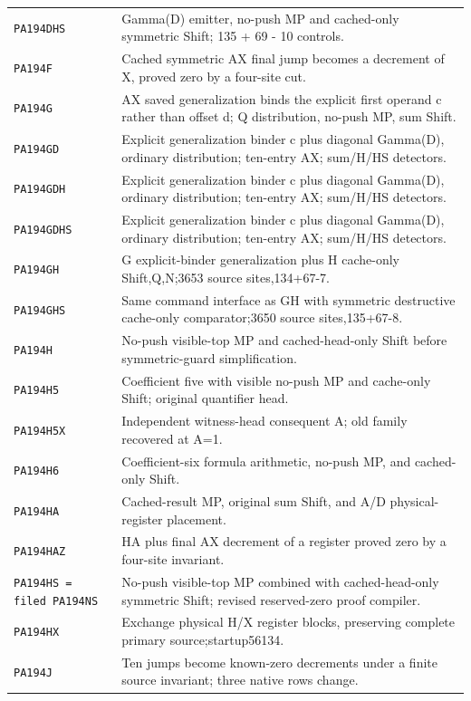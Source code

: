 \begin{longtable}{@{}p{.29\linewidth}p{.65\linewidth}@{}}
\texttt{PA194DHS} & Gamma(D) emitter, no-push MP and cached-only symmetric Shift; 135 + 69 - 10 controls.\\[3pt]
\texttt{PA194F} & Cached symmetric AX final jump becomes a decrement of X, proved zero by a four-site cut.\\[3pt]
\texttt{PA194G} & AX saved generalization binds the explicit first operand c rather than offset d; Q distribution, no-push MP, sum Shift.\\[3pt]
\texttt{PA194GD} & Explicit generalization binder c plus diagonal Gamma(D), ordinary distribution; ten-entry AX; sum/H/HS detectors.\\[3pt]
\texttt{PA194GDH} & Explicit generalization binder c plus diagonal Gamma(D), ordinary distribution; ten-entry AX; sum/H/HS detectors.\\[3pt]
\texttt{PA194GDHS} & Explicit generalization binder c plus diagonal Gamma(D), ordinary distribution; ten-entry AX; sum/H/HS detectors.\\[3pt]
\texttt{PA194GH} & G explicit-binder generalization plus H cache-only Shift,Q,N;3653 source sites,134+67-7.\\[3pt]
\texttt{PA194GHS} & Same command interface as GH with symmetric destructive cache-only comparator;3650 source sites,135+67-8.\\[3pt]
\texttt{PA194H} & No-push visible-top MP and cached-head-only Shift before symmetric-guard simplification.\\[3pt]
\texttt{PA194H5} & Coefficient five with visible no-push MP and cache-only Shift; original quantifier head.\\[3pt]
\texttt{PA194H5X} & Independent witness-head consequent A; old family recovered at A=1.\\[3pt]
\texttt{PA194H6} & Coefficient-six formula arithmetic, no-push MP, and cached-only Shift.\\[3pt]
\texttt{PA194HA} & Cached-result MP, original sum Shift, and A/D physical-register placement.\\[3pt]
\texttt{PA194HAZ} & HA plus final AX decrement of a register proved zero by a four-site invariant.\\[3pt]
\texttt{PA194HS = filed PA194NS} & No-push visible-top MP combined with cached-head-only symmetric Shift; revised reserved-zero proof compiler.\\[3pt]
\texttt{PA194HX} & Exchange physical H/X register blocks, preserving complete primary source;startup56134.\\[3pt]
\texttt{PA194J} & Ten jumps become known-zero decrements under a finite source invariant; three native rows change.\\[3pt]

\end{longtable}
